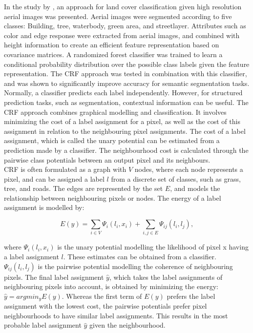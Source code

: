 In the study by \cite{Kluckner_semantic_height}, an approach for land cover classification given high resolution aerial images was presented. Aerial images were segmented according to five classes: Building, tree, waterbody, green area, and streetlayer. Attributes such as color and edge response were extracted from aerial images, and combined with height information to create an efficient feature representation based on covariance matrices. A randomized forest classifier was trained to learn a conditional probability distribution over the possible class labels given the feature representation. The \ac{CRF} approach was tested in combination with this classifier, and was shown to significantly improve accuracy for semantic segmentation tasks. \\ 

Normally, a classifier predicts each label independently. However, for structured prediction tasks, such as segmentation, contextual information can be useful. The \ac{CRF} approach combines graphical modelling and classification. It involves minimizing the cost of a label assignment for a pixel, as well as the cost of this assignment in relation to the neighbouring pixel assignments. The cost of a label assignment, which is called the unary potential can be estimated from a prediction made by a classifier. The neighbourhood cost is calculated through the pairwise class potentials between an output pixel and its neighbours.\\

\ac{CRF} is often formulated as a graph with $V$ nodes, where each node represents a pixel, and can be assigned a label $l$ from a discrete set of classes, such as grass, tree, and roads. The edges are represented by the set $E$, and models the relationship between neighbouring pixels or nodes. The energy of a label assignment is modelled by:

$$E(y) = \sum\limits_{i\in V} \Psi_i(l_i, x_i) + \sum\limits_{i,j\in E}\Psi_{ij}(l_i, l_j),$$

where $\Psi_i(l_i, x_i)$ is the unary potential modelling the likelihood of pixel x having a label assignment $l$. These estimates can be obtained from a classifier.  $\Psi_{ij}(l_i, l_j)$ is the pairwise potential modelling the coherence of neighbouring pixels. The final label assignment $\hat{y}$, which takes the label assignments of neighbouring pixels into account, is obtained by minimizing the energy:  $\hat{y} =argmin_y E(y)$. Whereas the first term of $E(y)$ prefers the label assignment with the lowest cost, the pairwise potentials prefer pixel neighbourhoods to have similar label assignments. This results in the most probable label assignment $\hat{y}$ given the neighbourhood.\\

